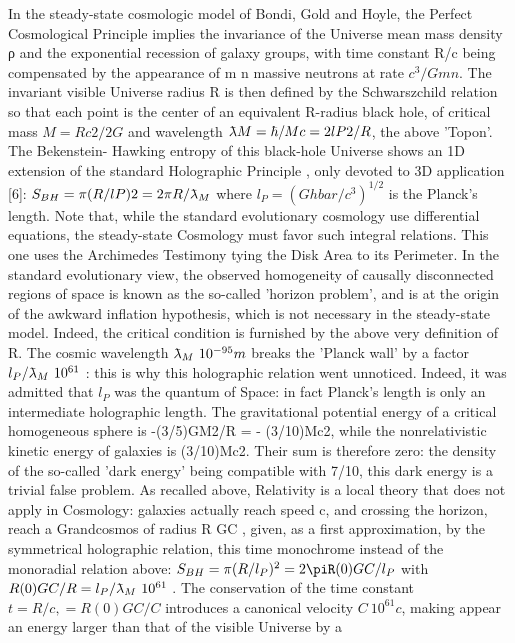 In the steady-state cosmologic model of Bondi, Gold and Hoyle, the Perfect Cosmological
Principle implies the invariance of the Universe mean mass density ρ and the exponential recession
of galaxy groups, with time constant R/c being compensated by the appearance of m n massive
neutrons at rate $c^3 /Gm n $. The invariant visible Universe radius R is then defined by the
Schwarszchild relation so that each point is the center of an equivalent R-radius black hole, of
critical mass $M = Rc 2 /2G$ and wavelength $\lambdabar M = \hbar/Mc = 2l P2 /R$, the above 'Topon'. The Bekenstein-
Hawking entropy of this black-hole Universe shows an 1D extension of the standard Holographic
Principle , only devoted to 3D application [6]:
$S_{BH} = \pi(R/l P )2 = 2\pi R/\lambdabar_{M}$
where $l_{P} = (Ghbar/c^3 )^{1/2}$ is the Planck's length. Note that, while the standard evolutionary cosmology
use differential equations, the steady-state Cosmology must favor such integral relations. This one
uses the Archimedes Testimony tying the Disk Area to its Perimeter.
In the standard evolutionary view, the observed homogeneity of causally disconnected regions
of space is known as the so-called 'horizon problem', and is at the origin of the awkward inflation
hypothesis, which is not necessary in the steady-state model. Indeed, the critical condition is
furnished by the above very definition of R.
The cosmic wavelength $\lambdabar_M ~ 10^{-95} m$ breaks the 'Planck wall' by a factor $l_{P} /\lambdabar_{M} ~ 10^{61}$ : this is why this holographic relation went unnoticed. Indeed, it was admitted that $l_{P}$ was the quantum of Space: in fact Planck's length is only an intermediate holographic length.
The gravitational potential energy of a critical homogeneous sphere is -(3/5)GM2/R = -
(3/10)Mc2, while the nonrelativistic kinetic energy of galaxies is (3/10)Mc2. Their sum is therefore
zero: the density of the so-called 'dark energy' being compatible with 7/10, this dark energy is a
trivial false problem. As recalled above, Relativity is a local theory that does not apply in
Cosmology: galaxies actually reach speed c, and crossing the horizon, reach a Grandcosmos of
radius R GC , given, as a first approximation, by the symmetrical holographic relation, this time
monochrome instead of the monoradial relation above:
$S_{BH} = \pi(R/l_P )^{2} = 2\piR (0) GC /l_{P}$
with $R (0) GC /R = l_{P} /\lambdabar_{M} ~ 10^{61}$ . The conservation of the time constant $t = R/c, = R (0) GC /C$ introduces a canonical velocity $C ~ 10^{61} c$, making appear an energy larger than that of the visible Universe by a
